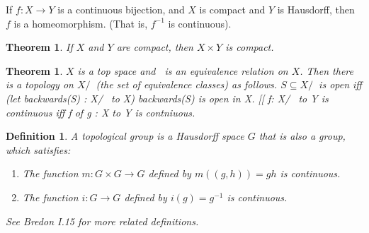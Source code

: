 \documentclass[11pt,leqno,oneside]{amsart}
\theoremstyle{mystyle} \newtheorem{thrm}[thm]{Theorem}
\theoremstyle{mystyle} \newtheorem{defi}[thm]{Definition}
\begin{document}
\begin{cor}
	If $f : X \to Y$ is a continuous bijection, and $X$ is compact and $Y$ is Hausdorff, then $f$ is a homeomorphism. (That is, $f^{-1}$ is continuous).
\end{cor}
\begin{thrm}
	If $X$ and $Y$ are compact, then $X \times Y$ is compact.
\end{thrm}
\begin{thrm}
	$X$ is a top space and $~$ is an equivalence relation on $X$.  Then there is a topology on $X/~$ (the set of equivalence classes) as follows.  $S \subseteq X/~$ is open iff (let backwards(S) : X/~ to X) backwards(S) is open in X.  [[ f: X/~ to Y is continuous iff f of g : X to Y is contniuous.
\end{thrm}
\begin{defi}
	A \emph{topological group} is a Hausdorff space $G$ that is also a group, which satisfies:
	\begin{enumerate}
		\item The function $m : G \times G \to G$ defined by $m((g,h)) = gh$ is continuous.
		\item The function $i : G \to G$ defined by $i(g) = g^{-1}$ is continuous.
	\end{enumerate}
	See Bredon I.15 for more related definitions.
\end{defi}
\end{document}
